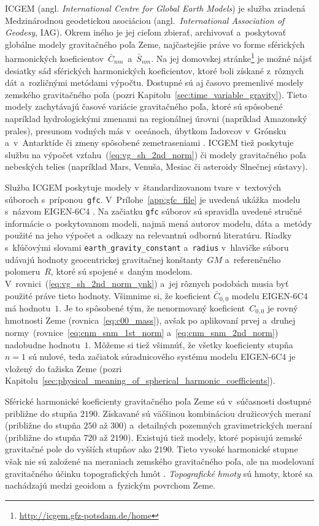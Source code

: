 \documentclass[a4paper, 12pt]{book}
\begin{document}
ICGEM (angl. \emph{International Centre for Global Earth Models}) je služba 
zriadená Medzinárodnou geodetickou asociáciou (angl.~\emph{International 
Association of Geodesy}, IAG).  Okrem iného je jej cieľom zbierať, archivovať 
a~poskytovať globálne modely gravitačného poľa Zeme, najčastejšie práve vo 
forme sférických harmonických koeficientov~$\bar{C}_{nm}$~a~$\bar{S}_{nm}$.  Na 
jej domovskej 
stránke\footnote{\label{fn:icgem_link}\url{http://icgem.gfz-potsdam.de/home}} 
je možné nájsť desiatky sád sférických harmonických koeficientov, ktoré boli 
získané z~rôznych dát a~rozličnými metódami výpočtu.  Dostupné sú aj časovo 
premenlivé modely zemského gravitačného poľa (pozri 
Kapitolu~\ref{sec:time_variable_gravity}).  Tieto modely zachytávajú časové 
variácie gravitačného poľa, ktoré sú spôsobené napríklad hydrologickými zmenami 
na regionálnej úrovni (napríklad Amazonský prales), presunom vodných más 
v~oceánoch, úbytkom ľadovcov v~Grónsku a~v~Antarktíde či zmeny spôsobené 
zemetraseniami \parencite{Wahr2007}.  ICGEM tiež poskytuje službu na výpočet 
vzťahu~(\ref{eq:vg_sh_2nd_norm}) či modely gravitačného poľa nebeských telies 
(napríklad Mars, Venuša, Mesiac či asteroidy Slnečnej sústavy).

Služba ICGEM poskytuje modely v~štandardizovanom tvare v~textových súboroch 
s~príponou~\texttt{gfc}.  V~Prílohe~\ref{app:gfc_file} je uvedená ukážka~modelu 
s~názvom EIGEN-6C4 \parencite{EIGEN-6C4}.  Na začiatku \texttt{gfc} súborov sú 
spravidla uvedené stručné informácie o~poskytovanom modeli, najmä mená autorov 
modelu, dáta a~metódy použité na jeho výpočet a~odkazy na relevantnú odbornú 
literatúru.  Riadky s~kľúčovými slovami \texttt{earth\_gravity\_constant} 
a~\texttt{radius} v~hlavičke súboru udávajú hodnoty geocentrickej gravitačnej 
konštanty~$GM$ a~referenčného polomeru~$R$, ktoré sú spojené s~daným modelom.  
V~rovnici~(\ref{eq:vg_sh_2nd_norm_ynk}) a~jej rôznych podobách musia byť 
použité práve tieto hodnoty.  Všimnime si, že koeficient $\bar{C}_{0,0}$ modelu 
EIGEN-6C4 má hodnotu~$1$.  Je to spôsobené tým, že nenormovaný 
koeficient~$C_{0,0}$ je rovný hmotnosti Zeme (rovnica~\ref{eq:c00_mass}), avšak 
po aplikovaní prvej a~druhej normy~(rovnice~\ref{eq:cnm_snm_1st_norm} 
a~\ref{eq:cnm_snm_2nd_norm}) nadobudne hodnotu~$1$.  Môžeme si tiež všimnúť, že 
všetky koeficienty stupňa~$n = 1$ sú nulové, teda začiatok súradnicového 
systému modelu EIGEN-6C4 je vložený do ťažiska Zeme (pozri 
Kapitolu~\ref{sec:physical_meaning_of_spherical_harmonic_coefficients}).

Sférické harmonické koeficienty gravitačného poľa Zeme sú v~súčasnosti dostupné
približne do stupňa $2190$.  Získavané sú väčšinou kombináciou družicových
meraní (približne do stupňa $250$ až $300$) a~detailných pozemných
gravimetrických meraní (približne do stupňa $720$ až $2190$).  Existujú tiež 
modely, ktoré popisujú zemské gravitačné pole do vyšších stupňov ako $2190$.  
Tieto vysoké harmonické stupne však nie sú založené na meraniach zemského 
gravitačného poľa, ale na modelovaní gravitačného účinku topografických hmôt 
\parencite[napríklad][]{Ince2020}.  \emph{Topografické 
hmoty}\label{def:topographic_masses} sú hmoty, ktoré sa nachádzajú medzi 
geoidom a~fyzickým povrchom Zeme.
\end{document}
